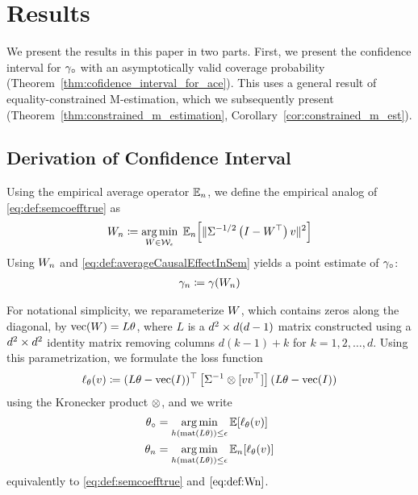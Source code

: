 

\section{Results} %
\label{sec:result}

We present the results in this paper in two parts. First, we present the confidence interval for $\gamma_\circ$ with an asymptotically valid coverage probability (Theorem~\ref{thm:cofidence_interval_for_ace}). This uses a general result of equality-constrained M-estimation, which we subsequently present (Theorem~\ref{thm:constrained_m_estimation}, Corollary~\ref{cor:constrained_m_est}).

\subsection{Derivation of Confidence Interval}

Using the empirical average operator $\mathbb{E}_n$, we define the empirical analog of \eqref{eq:def:semcoefftrue} as
\begin{align}
    \label{eq:def:Wn}
    W_n \coloneqq \operatorname*{arg\,min}_{W \in \mathcal W_\epsilon} \;
    \mathbb{E}_n\Big[ \lVert\Sigma^{-1/2}  \left(I - W^\top \right)v \rVert^2 \Big]
\end{align}
Using $W_n$ and \eqref{eq:def:averageCausalEffectInSem} yields a point estimate of $\gamma_\circ$:
\begin{align}
    \label{eq:def:gamma_n}
    \gamma_n  \coloneqq \gamma(W_n)
\end{align}

For notational simplicity, we reparameterize $W$, which contains zeros along the diagonal,
by $\operatorname*{vec}(W) = L \theta$, where $L$ is a $d^2  \times d(d-1)$ matrix constructed using a $d^2  \times d^2$ identity matrix removing columns $d(k-1)+k$ for $k=1,2,\dots, d$. Using this parametrization, we formulate the loss function
\begin{align}
    \label{eq:def:mest:loss}
    \small{
        \ell_\theta(v) \coloneqq (L\theta- \operatorname*{vec}(I))^\top\left[\Sigma^{-1} \otimes[vv^\top] \right]
        (L\theta- \operatorname*{vec}(I))
    }
\end{align}
using the Kronecker product $\otimes$, and we write
\begin{align}
    \label{eq:def:theta0}
    \theta_\circ & = \operatorname*{arg\,min}_{
        h(\operatorname*{mat}(L\theta)) \leq \epsilon }
    \mathbb{E}[\ell_{\theta}(v) ] \\
    \label{eq:def:thetan}
    \theta_n & = \operatorname*{arg\,min}_{
        h(\operatorname*{mat}(L\theta)) \leq \epsilon }
    \mathbb{E}_n[\ell_{\theta}(v) ]
\end{align}
equivalently to \eqref{eq:def:semcoefftrue} and $\eqref{eq:def:Wn}$.

